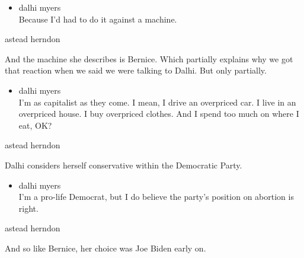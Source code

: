 \begin{itemize}
\tightlist
\item
  dalhi myers\\
  Because I'd had to do it against a machine.
\end{itemize}

astead herndon

And the machine she describes is Bernice. Which partially explains why
we got that reaction when we said we were talking to Dalhi. But only
partially.

\begin{itemize}
\tightlist
\item
  dalhi myers\\
  I'm as capitalist as they come. I mean, I drive an overpriced car. I
  live in an overpriced house. I buy overpriced clothes. And I spend too
  much on where I eat, OK?
\end{itemize}

astead herndon

Dalhi considers herself conservative within the Democratic Party.

\begin{itemize}
\tightlist
\item
  dalhi myers\\
  I'm a pro-life Democrat, but I do believe the party's position on
  abortion is right.
\end{itemize}

astead herndon

And so like Bernice, her choice was Joe Biden early on.

